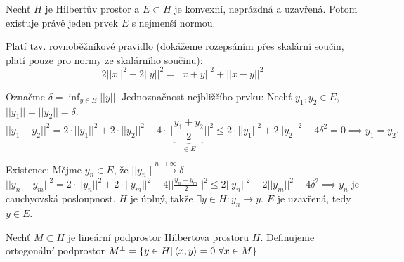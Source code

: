 \documentclass[12pt]{article}					%
\begin{document}
	\begin{veta}
		Nechť $H$ je Hilbertův prostor a $E \subset H$ je konvexní, neprázdná a uzavřená. Potom existuje právě jeden prvek $E$ s nejmenší normou.

		\begin{dukazin}
			Platí tzv. rovnoběžníkové pravidlo (dokážeme rozepsáním přes skalární součin, platí pouze pro normy ze skalárního součinu):
			$$ 2||x||^2 + 2||y||^2 = ||x + y||^2 + ||x - y||^2 $$
			
			Označme $\delta = \inf_{y \in E} ||y||$. Jednoznačnost nejbližšího prvku: Nechť $y_1, y_2 \in E$, $||y_1|| = ||y_2|| = \delta$.
			$$ ||y_1 - y_2||^2 = 2·||y_1||^2 + 2·||y_2||^2 - 4·||\underbrace{\frac{y_1 + y_2}{2}}_{\in E}||^2 ≤ 2·||y_1||^2 + 2||y_2||^2 - 4\delta^2 = 0 \implies y_1 = y_2. $$

			Existence: Mějme $y_n \in E$, že $||y_n|| \overset{n \rightarrow ∞}{\rightarrow} \delta$. $||y_n - y_m||^2 = 2·||y_n||^2 + 2·||y_m||^2 - 4||\frac{y_n + y_m}{2}||^2 ≤ 2||y_n||^2 - 2||y_m||^2 - 4\delta^2 \implies y_n$ je cauchyovská posloupnost. $H$ je úplný, takže $\exists y \in H: y_n \rightarrow y$. $E$ je uzavřená, tedy $y \in E$.
		\end{dukazin}
	\end{veta}

	\begin{definice}
		Nechť $M \subset H$ je lineární podprostor Hilbertova prostoru $H$. Definujeme ortogonální podprostor $M^\perp = \{y \in H|\left\langle x, y\right\rangle = 0\ \forall x \in M\}$.
	\end{definice}
\end{document}
